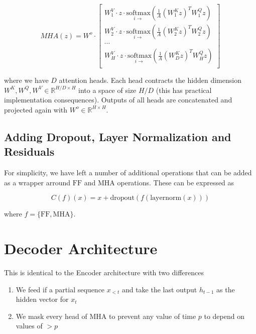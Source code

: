\begin{equation}
MHA(z) =  W^o \cdot
\begin{bmatrix}
    W^V_1 \cdot z \cdot \underset{i \rightarrow}{\mathrm{softmax}}\left( \frac{1}{A} \left(W^K_1 z\right)^T W^Q_1 z \right)\\
    W^V_2 \cdot z \cdot \underset{i \rightarrow}{\mathrm{softmax}}\left( \frac{1}{A} \left(W^K_2 z\right)^T W^Q_2 z \right)\\
    \cdots\\
    W^V_H \cdot z \cdot \underset{i \rightarrow}{\mathrm{softmax}}\left( \frac{1}{A} \left(W^K_D z\right)^T W^Q_H z \right)\\
\end{bmatrix}\nonumber
\end{equation}

where we have $D$ attention heads. Each head contracts the hidden dimension $W^K, W^Q, W^V \in \mathbb{R}^{H / D \times H}$ into a space of size $H / D$ (this has practical implementation consequences). Outputs of all heads are concatenated and projected again with $W^o \in \mathbb{R}^{H \times H}$.

\subsection{Adding Dropout, Layer Normalization and Residuals}

For simplicity, we have left a number of additional operations that can be added as a wrapper arround $\mathrm{FF}$ and $\mathrm{MHA}$ operations. These can be expressed as

\begin{equation}
C(f)(x) = x + \mathrm{dropout}(f(\mathrm{layernorm}(x)))
\end{equation}

where $f = \{\mathrm{FF}, \mathrm{MHA}\}$.


\section{Decoder Architecture}

This is identical to the Encoder architecture with two differences

\begin{enumerate}
\item We feed if a partial sequence $x_{<t}$ and take the last output $h_{t-1}$ as the hidden vector for $x_t$
\item We mask every head of $\mathrm{MHA}$ to prevent any value of time $p$ to depend on values of $>p$
\end{enumerate}

